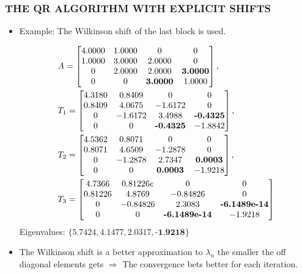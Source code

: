 \documentclass[a4paper,8pt]{beamer} %
\newcommand{\ts}[1]{\textbf{#1}}
\newcommand{\smatrix}[1]{\left[\begin{matrix} #1 \end{matrix}\right]}
\begin{document}
\begin{frame}  %
\frametitle{THE QR ALGORITHM WITH EXPLICIT SHIFTS}
\begin{itemize}
\item <1-> Example: The Wilkinson shift of the last block is used.
\begin{tiny}
\begin{align}
&A = \smatrix{
   4.0000  & 1.0000 &       0  &      0 \\
   1.0000  & 3.0000 &  2.0000  &      0 \\
        0  & 2.0000 &  2.0000  & \ts{3.0000} \\
        0  &      0 &  \ts{3.0000}  & 1.0000 }
,\,\notag\\
&T_1 = \smatrix{
   4.3180 & 0.8409 &      0 &      0\\
   0.8409 & 4.0675 &-1.6172 &      0\\
        0 &-1.6172 & 3.4988 &\ts{-0.4325}\\
        0 &      0 &\ts{-0.4325} &-1.8842}
,\,\notag\\
&T_2 = \smatrix{
   4.5362  & 0.8071  &      0 &       0\\
   0.8071  & 4.6509  &-1.2878 &       0\\
        0  &-1.2878  & 2.7347 &  \ts{0.0003}\\
        0  &      0  & \ts{0.0003} & -1.9218}
,\,\notag\\
&T_3 = \smatrix{
   4.7366 &  0.81226e  &      0  &      0\\
   0.81226 &  4.8769  &-0.84826  &      0\\
        0 & -0.84826  & 2.3083  &\ts{-6.1489e-14}\\
        0 &       0  &\ts{-6.1489e-14}  &-1.9218}
\end{align}
Eigenvalues: $\{5.7424, 4.1477, 2.0317, \ts {-1.9218} \}$
\end{tiny}
\item <2-> The Wilkinson shift is a better approximation to $\lambda_{n}$ the smaller
	the off diagonal elements gets $\Rightarrow$ The convergence bets better for each iteration.
\end{itemize}
\end{frame} %
\end{document}
